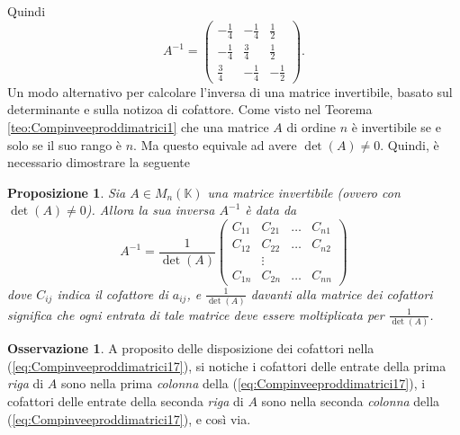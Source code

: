 \documentclass{book}
\theoremstyle{definition}
\newtheorem{oss}{Osservazione}[section]
\theoremstyle{plain}
\newtheorem{prop}{Proposizione}[section]
\begin{document}
Quindi
\begin{equation*}
  A^{-1}=
  \begin{pmatrix}
    -\frac{1}{4} & -\frac{1}{4} & \frac{1}{2}\\
    -\frac{1}{4} & \frac{3}{4} & \frac{1}{2}\\
    \frac{3}{4} & -\frac{1}{4} & -\frac{1}{2}
  \end{pmatrix}.
\end{equation*}
Un modo alternativo per calcolare l'inversa di una matrice invertibile, basato sul determinante e sulla
notizoa di cofattore. Come visto nel Teorema \ref{teo:Compinveeproddimatrici1} che una matrice $A$ di
ordine $n$ è invertibile se e solo se il suo rango è $n$. Ma questo equivale ad avere $\det (A)\neq 0$.
Quindi, è necessario dimostrare la seguente
\begin{prop}
  \label{prop:Compinveeproddimatrici3}
  Sia $A\in M_n(\mathds{K})$ una matrice invertibile (ovvero con $\det(A)\neq 0$). Allora la sua
  inversa $A^{-1}$ è data da
  \begin{equation}
    \label{eq:Compinveeproddimatrici17}
    A^{-1}=\frac{1}{\det(A)}
    \begin{pmatrix}
      C_{11} & C_{21} & \dots & C_{n1}\\
      C_{12} & C_{22} & \dots & C_{n2}\\
             & \vdots\\
      C_{1n} & C_{2n} &\dots & C_{nn}
    \end{pmatrix}
  \end{equation}
  dove $C_{ij}$ indica il cofattore di $a_{ij}$, e $\frac{1}{\det(A)}$ davanti alla matrice dei cofattori
  significa che ogni entrata di tale matrice deve essere moltiplicata per $\frac{1}{\det(A)}$.
\end{prop}
\begin{oss}
  \label{oss:Compinveeproddimatrici4}
  A proposito delle disposizione dei cofattori nella (\ref{eq:Compinveeproddimatrici17}), si notiche i
  cofattori delle entrate della prima \textit{riga} di $A$ sono nella prima \textit{colonna} della
  (\ref{eq:Compinveeproddimatrici17}), i cofattori delle entrate della seconda \textit{riga} di $A$
  sono nella seconda \textit{colonna} della (\ref{eq:Compinveeproddimatrici17}), e così via.
\end{oss}
\end{document}
